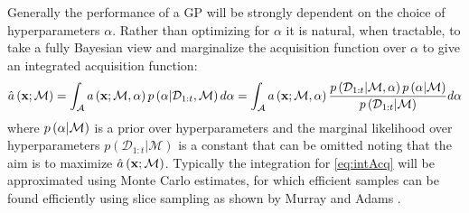 Generally the performance of a GP will be strongly dependent on the choice of hyperparameters $\alpha$.  Rather than optimizing for $\alpha$ it is natural, when tractable, to take a fully Bayesian view and marginalize the acquisition function over $\alpha$ \cite{osborne2009gaussian, snoek2012practical} to give an integrated acquisition function:
\begin{align}
\label{eq:intAcq}
\hat{a}\left(\mathbf{x}  ; \mathcal{M}\right) = \int_{\mathcal{A}} a\left(\mathbf{x}  ; \mathcal{M}, \alpha\right) p\left(\alpha | \mathcal{D}_{1 : t}, \mathcal{M}\right) d\alpha = \int_{\mathcal{A}} a\left(\mathbf{x}  ; \mathcal{M}, \alpha\right) \frac{p\left(\mathcal{D}_{1 : t} | \mathcal{M}, \alpha\right) p\left(\alpha | \mathcal{M}\right)}{p\left(\mathcal{D}_{1 : t} | \mathcal{M}\right)} d\alpha
\end{align}
where $ p\left(\alpha | \mathcal{M}\right)$ is a prior over hyperparameters and the marginal likelihood over hyperparameters $p\left(\mathcal{D}_{1 : t} | \mathcal{M}\right)$ is a constant that can be omitted noting that the aim is to maximize $\hat{a}\left(\mathbf{x}  ; \mathcal{M}\right)$.  Typically the integration for \eqref{eq:intAcq} will be approximated using Monte Carlo estimates, for which efficient samples can be found efficiently using slice sampling as shown by Murray and Adams \cite{murray2010slice}.